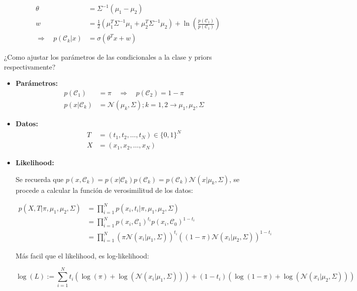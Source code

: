 \begin{align}
\theta &= \Sigma^{-1}(\mu_1-\mu_2)\\
w &= \frac{1}{2}(\mu_1^T\Sigma^{-1}\mu_1+\mu_2^T\Sigma^{-1}\mu_2)
+\ln(\frac{p(\mathcal{C}_1)}{p(\mathcal{C}_1)})\\
\Rightarrow \quad p(\mathcal{C}_k|x) &= \sigma(\theta^Tx+w)
\end{align}

¿Como ajustar los parámetros de las condicionales a la clase y priors respectivamente?

\begin{itemize}
    \item\textbf{Parámetros:}
    \begin{align}
    p(\mathcal{C}_1)&=\pi \quad \Rightarrow \quad p(\mathcal{C}_2)=1-\pi\\
    p(x|\mathcal{C}_k) &= \mathcal{N}(\mu_k,  \Sigma); k=1,2
    \rightarrow \mu_1,\mu_2,\Sigma
    \end{align}
    
    \item\textbf{Datos:}
    \begin{align}
    T&=(t_1,t_2,\ldots,t_N) \in \{0,1\}^N\\
    X&=(x_1,x_2,\ldots,x_N)
    \end{align}
    
    \item\textbf{Likelihood:}
    
    Se recuerda que $p(x,\mathcal{C}_k)=p(x|\mathcal{C}_k)p(\mathcal{C}_k)=p(\mathcal{C}_k)\mathcal{N}(x|\mu_k,\Sigma)$, se procede a calcular la función de verosimilitud de los datos:
    
    \begin{align}
    p(X,T|\pi,\mu_1,\mu_2,\Sigma) &= \prod_{i=1}^{N}p(x_i,t_i|\pi,\mu_1,\mu_2,\Sigma)\\
    &= \prod_{i=1}^{N}p(x_i,\mathcal{C}_1)^{t_i}p(x_i,\mathcal{C}_0)^{1-t_i}\\
    &= \prod_{i=1}^{N}(\pi\mathcal{N}(x_i|\mu_1,\Sigma))^{t_i}
    ((1-\pi)\mathcal{N}(x_i|\mu_2,\Sigma))^{1-t_i}
    \end{align}
    
    Más facil que el likelihood, es log-likelihood:
    
    \begin{equation}
    \log(L) := \sum_{i=1}^{N}t_i(\log(\pi)+\log(\mathcal{N}(x_i|\mu_1,\Sigma)))+(1-t_i)(\log(1-\pi)+\log(\mathcal{N}(x_i|\mu_2,\Sigma)))
    \end{equation}
    

\end{itemize}
